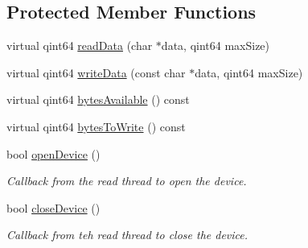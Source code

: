 \subsection*{\-Protected \-Member \-Functions}
\begin{DoxyCompactItemize}
\item 
virtual qint64 \hyperlink{group___raw_h_i_d_plugin_gac4b532c2c57925141897d91434924e80}{read\-Data} (char $\ast$data, qint64 max\-Size)
\item 
virtual qint64 \hyperlink{group___raw_h_i_d_plugin_ga59184fec2a68eecf3e08e81303b8cdbe}{write\-Data} (const char $\ast$data, qint64 max\-Size)
\item 
virtual qint64 \hyperlink{group___raw_h_i_d_plugin_ga5bd4826624aa1689aedbfd1832c4ddb4}{bytes\-Available} () const 
\item 
virtual qint64 \hyperlink{group___raw_h_i_d_plugin_gaf0246fd49e7dc9cda82b983312f4a782}{bytes\-To\-Write} () const 
\item 
bool \hyperlink{group___raw_h_i_d_plugin_gafc323c516287e2e1e5e12b425cd28b4b}{open\-Device} ()
\begin{DoxyCompactList}\small\item\em \-Callback from the read thread to open the device. \end{DoxyCompactList}\item 
bool \hyperlink{group___raw_h_i_d_plugin_ga6cf706b44d1aaf58b4218b3cacbc6218}{close\-Device} ()
\begin{DoxyCompactList}\small\item\em \-Callback from teh read thread to close the device. \end{DoxyCompactList}\end{DoxyCompactItemize}
